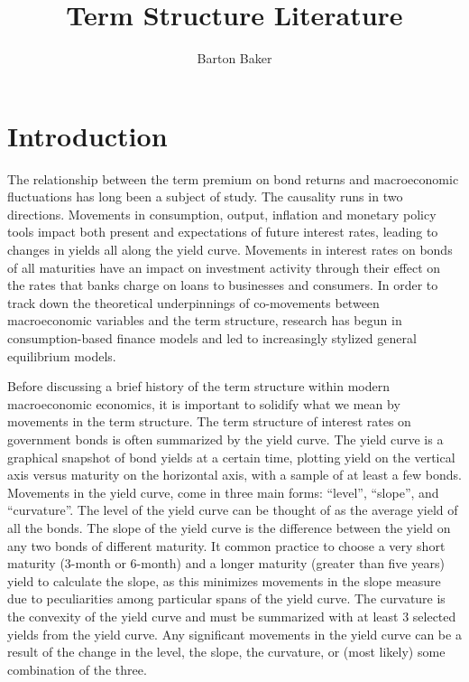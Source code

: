 \documentclass{article}
\title{Term Structure Literature}
\author{Barton Baker}
\numberwithin{equation}{section}
\begin{document}
\doublespacing
\maketitle

\section{Introduction}
\label{sec:intro}

The relationship between the term premium on bond returns and macroeconomic
fluctuations has long been a subject of study. The causality runs in two
directions. Movements in consumption, output, inflation and monetary policy
tools impact both present and expectations of future interest rates, leading to
changes in yields all along the yield curve. Movements in interest rates on
bonds of all maturities have an impact on investment activity through their
effect on the rates that banks charge on loans to businesses and consumers. In
order to track down the theoretical underpinnings of co-movements between
macroeconomic variables and the term structure, research has begun in
consumption-based finance models and led to increasingly stylized general
equilibrium models.

Before discussing a brief history of the term structure within modern
macroeconomic economics, it is important to solidify what we mean by movements
in the term structure. The term structure of interest rates on government bonds
is often summarized by the yield curve. The yield curve is a graphical snapshot
of bond yields at a certain time, plotting yield on the vertical axis versus
maturity on the horizontal axis, with a sample of at least a few bonds.
Movements in the yield curve, come in three main forms: ``level'', ``slope'',
and ``curvature''. The level of the yield curve can be thought of as the
average yield of all the bonds. The slope of the yield curve is the difference
between the yield on any two bonds of different maturity. It common practice to
choose a very short maturity (3-month or 6-month) and a longer maturity
(greater than five years) yield to calculate the slope, as this minimizes
movements in the slope measure due to peculiarities among particular spans of
the yield curve. The curvature is the convexity of the yield curve and must be
summarized with at least 3 selected yields from the yield curve. Any
significant movements in the yield curve can be a result of the change in the
level, the slope, the curvature, or (most likely) some combination of the
three.
\end{document}
